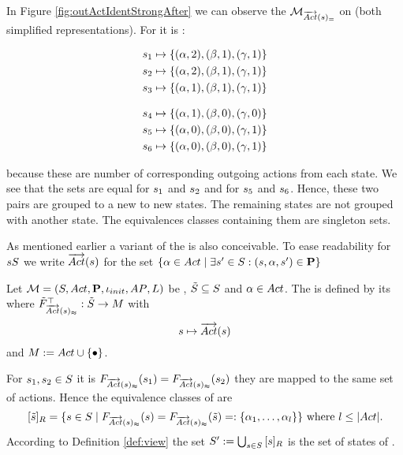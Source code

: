 \documentclass[preview]{standalone}
\begin{document}
In Figure \ref{fig:outActIdentStrongAfter} we can observe the \viewN ${{{{{\mathcal{M}}}}_{{{\overrightarrow{{Act}}}({s})_=}}}}$ on \mdp (both simplified representations). 
For \viewstrongoutactident it is \gfctstrongoutactident :

\begin{minipage}{.45\textwidth}
\begin{align*}
	{s}_1 &\mapsto \{({\alpha},2), ({\beta},1), ({\gamma},1)\} \\
	{s}_2 &\mapsto \{({\alpha},2), ({\beta},1), ({\gamma},1)\} \\
	{s}_3 &\mapsto \{({\alpha},1), ({\beta},1), ({\gamma},1)\} \\	
\end{align*}
\end{minipage}
\begin{minipage}{.55\textwidth}
\begin{align*}
	{s}_4 &\mapsto \{({\alpha},1), ({\beta},0), ({\gamma},0)\} \\
	{s}_5 &\mapsto \{({\alpha},0), ({\beta},0), ({\gamma},1)\} \\
	{s}_6 &\mapsto \{({\alpha},0), ({\beta},0), ({\gamma},1)\} \\
\end{align*}
\end{minipage}

because these are number of corresponding outgoing actions from each state. We see that the sets are equal for ${s}_1$ and ${s}_2$ and for ${s}_5$ and ${s}_6$. Hence, these two pairs are grouped to a new to new states. The remaining states are not grouped with another state. The equivalences classes containing them are singleton sets.

As mentioned earlier a \outactidentweak variant of the \outactident \viewN is also conceivable. To ease readability for ${s} {S}$ we write ${\overrightarrow{{Act}}}({s})$ for the set $\{{\alpha} \in {Act} \mid \exists {s}' \in {S} : ({s}, {\alpha}, {s}') \in {\ensuremath{{\textbf{P}}}}\}$

\begin{definition}
	Let ${{{\mathcal{M}}}} = {{({S}, {Act}, {\textbf{P}}, {\iota_{init}}, {AP}, {L})}}$ be \achgphN, ${\tilde{{S}}} \subseteq {S}$ and ${\alpha} \in {Act}$. The \viewN \viewweakoutactident is defined by its \grpfctN \gfctweakoutactident where ${{\tilde{F}_{{{\overrightarrow{{Act}}}({s})_\approx}}}^{\top}} : {\tilde{{S}}} \to {\ensuremath{{M}}}$ with
	\[
	{s} \mapsto {\overrightarrow{\ensuremath{{Act}}}}({s})
	\]
	and $\imggrp := \actions \cup \remset$.
\end{definition}

For ${s}_1, {s}_2 \in {S}$ it is ${{F_{{{\overrightarrow{{Act}}}({s})_\approx}}}}({s}_1) = {{F_{{{\overrightarrow{{Act}}}({s})_\approx}}}}({s}_2)$ \iffN they are mapped to the same set of actions. Hence the equivalence classes of \eqrelview are
\[
	{{[{\tilde{{s}}}]_{{R}}}} = \{ {s} \in {S} \mid {\ensuremath{{F_{{{\overrightarrow{{Act}}}({s})_\approx}}}}}({s}) = {{F_{{{\overrightarrow{{Act}}}({s})_\approx}}}}({\tilde{{s}}}) =: \{{\alpha}_1, \dots, {\alpha}_l\}\} \text{  where } l \leq |{Act}|.
\]
According to Definition \ref{def:view} the set ${S}' := \bigcup_{{s} \in {S}} {{[{s}]_{{R}}}}$ is the set of states of \viewweakoutactident.
\end{document}

